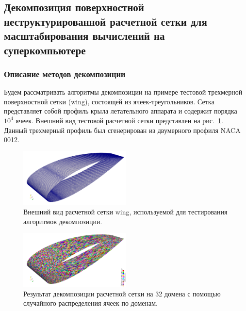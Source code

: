 \subsection{Декомпозиция поверхностной неструктурированной расчетной сетки для масштабирования вычислений на суперкомпьютере}

\subsubsection{Описание методов декомпозиции}

Будем рассматривать алгоритмы декомпозиции на примере тестовой трехмерной поверхностной сетки (wing), состоящей из ячеек-треугольников.
Сетка представляет собой профиль крыла летательного аппарата и содержит порядка $10^4$ ячеек.
Внешний вид тестовой расчетной сетки представлен на рис.~\ref{fig:text_2_decompsurf_wing_grid}.
Данный трехмерный профиль был сгенерирован из двумерного профиля NACA 0012.

\begin{figure}[ht]
	\centering
	\includegraphics[width=0.5\textwidth]{./pics/text_2_decompsurf/wing_grid.png}
	\caption{Внешний вид расчетной сетки wing, используемой для тестирования алгоритмов декомпозиции.}
	\label{fig:text_2_decompsurf_wing_grid}
\end{figure}

\begin{figure}[ht]
	\centering
	\includegraphics[width=0.5\textwidth]{./pics/text_2_decompsurf/wing_random_32.png}
	\caption{Результат декомпозиции расчетной сетки на 32 домена с помощью случайного распределения ячеек по доменам.}
	\label{fig:text_2_decompsurf_wing_random_32}
\end{figure}

